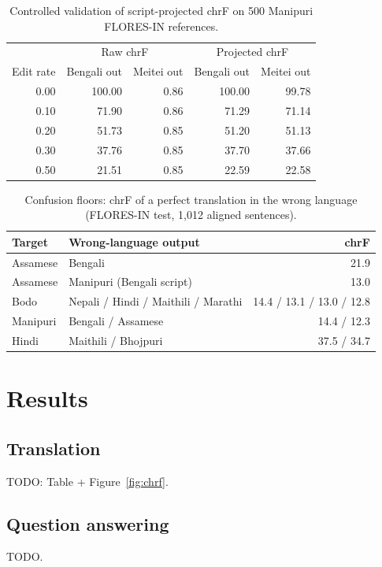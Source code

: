 \documentclass[11pt]{article}
\begin{document}
\begin{table}[t]\centering\small
\begin{tabular}{rrrrr}\toprule
& \multicolumn{2}{c}{Raw chrF} & \multicolumn{2}{c}{Projected chrF} \\
Edit rate & Bengali out & Meitei out & Bengali out & Meitei out \\\midrule
0.00 & 100.00 & 0.86 & 100.00 & 99.78 \\
0.10 & 71.90 & 0.86 & 71.29 & 71.14 \\
0.20 & 51.73 & 0.85 & 51.20 & 51.13 \\
0.30 & 37.76 & 0.85 & 37.70 & 37.66 \\
0.50 & 21.51 & 0.85 & 22.59 & 22.58 \\\bottomrule
\end{tabular}
\caption{Controlled validation of script-projected chrF on 500 Manipuri FLORES-IN references.}\label{tab:projection}
\end{table}

\begin{table}[t]\centering\small
\begin{tabular}{llr}\toprule
Target & Wrong-language output & chrF \\\midrule
Assamese & Bengali & 21.9 \\
Assamese & Manipuri (Bengali script) & 13.0 \\
Bodo & Nepali / Hindi / Maithili / Marathi & 14.4 / 13.1 / 13.0 / 12.8 \\
Manipuri & Bengali / Assamese & 14.4 / 12.3 \\
Hindi & Maithili / Bhojpuri & 37.5 / 34.7 \\\bottomrule
\end{tabular}
\caption{Confusion floors: chrF of a perfect translation in the wrong language (FLORES-IN test, 1{,}012 aligned sentences).}\label{tab:floors}
\end{table}

\section{Results}
\subsection{Translation}
% 
TODO: Table + Figure~\ref{fig:chrf}.
\subsection{Question answering}
% 
TODO.
\end{document}
